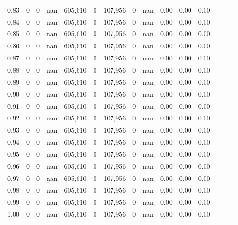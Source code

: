 \begin{tabular}{rrrrrrrrrrrrrrr}
0.83 &       0 &      0 &   nan &  605,610 &        0 &  107,956 &        0 &   nan &  0.00 &  0.00 &      0.00 \\
0.84 &       0 &      0 &   nan &  605,610 &        0 &  107,956 &        0 &   nan &  0.00 &  0.00 &      0.00 \\
0.85 &       0 &      0 &   nan &  605,610 &        0 &  107,956 &        0 &   nan &  0.00 &  0.00 &      0.00 \\
0.86 &       0 &      0 &   nan &  605,610 &        0 &  107,956 &        0 &   nan &  0.00 &  0.00 &      0.00 \\
0.87 &       0 &      0 &   nan &  605,610 &        0 &  107,956 &        0 &   nan &  0.00 &  0.00 &      0.00 \\
0.88 &       0 &      0 &   nan &  605,610 &        0 &  107,956 &        0 &   nan &  0.00 &  0.00 &      0.00 \\
0.89 &       0 &      0 &   nan &  605,610 &        0 &  107,956 &        0 &   nan &  0.00 &  0.00 &      0.00 \\
0.90 &       0 &      0 &   nan &  605,610 &        0 &  107,956 &        0 &   nan &  0.00 &  0.00 &      0.00 \\
0.91 &       0 &      0 &   nan &  605,610 &        0 &  107,956 &        0 &   nan &  0.00 &  0.00 &      0.00 \\
0.92 &       0 &      0 &   nan &  605,610 &        0 &  107,956 &        0 &   nan &  0.00 &  0.00 &      0.00 \\
0.93 &       0 &      0 &   nan &  605,610 &        0 &  107,956 &        0 &   nan &  0.00 &  0.00 &      0.00 \\
0.94 &       0 &      0 &   nan &  605,610 &        0 &  107,956 &        0 &   nan &  0.00 &  0.00 &      0.00 \\
0.95 &       0 &      0 &   nan &  605,610 &        0 &  107,956 &        0 &   nan &  0.00 &  0.00 &      0.00 \\
0.96 &       0 &      0 &   nan &  605,610 &        0 &  107,956 &        0 &   nan &  0.00 &  0.00 &      0.00 \\
0.97 &       0 &      0 &   nan &  605,610 &        0 &  107,956 &        0 &   nan &  0.00 &  0.00 &      0.00 \\
0.98 &       0 &      0 &   nan &  605,610 &        0 &  107,956 &        0 &   nan &  0.00 &  0.00 &      0.00 \\
0.99 &       0 &      0 &   nan &  605,610 &        0 &  107,956 &        0 &   nan &  0.00 &  0.00 &      0.00 \\
1.00 &       0 &      0 &   nan &  605,610 &        0 &  107,956 &        0 &   nan &  0.00 &  0.00 &      0.00 \\
\bottomrule
\end{tabular}
